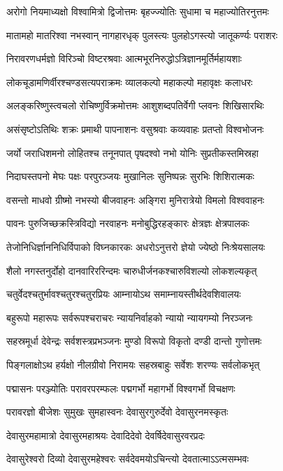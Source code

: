 \twolineshloka
{अरोगो नियमाध्यक्षो विश्वामित्रो द्विजोत्तमः}
{बृहज्ज्योतिः सुधामा च महाज्योतिरनुत्तमः}

\twolineshloka
{मातामहो मातरिश्वा नभस्वान् नागहारधृक्}
{पुलस्त्यः पुलहोऽगस्त्यो जातूकर्ण्यः पराशरः}

\twolineshloka
{निरावरणधर्मज्ञो विरिञ्चो विष्टरश्रवाः}
{आत्मभूरनिरुद्धोऽत्रिज्ञानमूर्तिर्महायशाः}

\twolineshloka
{लोकचूडामणिर्वीरश्चण्डसत्यपराक्रमः}
{व्यालकल्पो महाकल्पो महावृक्षः कलाधरः}

\twolineshloka
{अलङ्करिष्णुस्त्वचलो रोचिष्णुर्विक्रमोत्तमः}
{आशुशब्दपतिर्वेगी प्लवनः शिखिसारथिः}

\twolineshloka
{असंसृष्टोऽतिथिः शक्रः प्रमाथी पापनाशनः}
{वसुश्रवाः कव्यवाहः प्रतप्तो विश्वभोजनः}

\twolineshloka
{जर्यो जराधिशमनो लोहितश्च तनूनपात्}
{पृषदश्वो नभो योनिः सुप्रतीकस्तमिस्रहा}

\twolineshloka
{निदाघस्तपनो मेघः पक्षः परपुरञ्जयः}
{मुखानिलः सुनिष्पन्नः सुरभिः शिशिरात्मकः}

\twolineshloka
{वसन्तो माधवो ग्रीष्मो नभस्यो बीजवाहनः}
{अङ्गिरा मुनिरात्रेयो विमलो विश्ववाहनः}

\twolineshloka
{पावनः पुरुजिच्छक्रस्त्रिविद्यो नरवाहनः}
{मनोबुद्धिरहङ्कारः क्षेत्रज्ञः क्षेत्रपालकः}

\twolineshloka
{तेजोनिधिर्ज्ञाननिधिर्विपाको विघ्नकारकः}
{अधरोऽनुत्तरो ज्ञेयो ज्येष्ठो निःश्रेयसालयः}

\twolineshloka
{शैलो नगस्तनुर्दोहो दानवारिररिन्दमः}
{चारुधीर्जनकश्चारुविशल्यो लोकशल्यकृत्}

\twolineshloka
{चतुर्वेदश्चतुर्भावश्चतुरश्चतुरप्रियः}
{आम्नायोऽथ समाम्नायस्तीर्थदेवशिवालयः}

\twolineshloka
{बहुरूपो महारूपः सर्वरूपश्चराचरः}
{न्यायनिर्वाहको न्यायो न्यायगम्यो निरञ्जनः}

\twolineshloka
{सहस्रमूर्धा देवेन्द्रः सर्वशस्त्रप्रभञ्जनः}
{मुण्डो विरूपो विकृतो दण्डी दान्तो गुणोत्तमः}

\twolineshloka
{पिङ्गलाक्षोऽथ हर्यक्षो नीलग्रीवो निरामयः}
{सहस्रबाहुः सर्वेशः शरण्यः सर्वलोकभृत्}

\twolineshloka
{पद्मासनः परञ्ज्योतिः परावरपरम्फलः}
{पद्मगर्भो महागर्भो विश्वगर्भो विचक्षणः}

\twolineshloka
{परावरज्ञो बीजेशः सुमुखः सुमहास्वनः}
{देवासुरगुरुर्देवो देवासुरनमस्कृतः}

\twolineshloka
{देवासुरमहामात्रो देवासुरमहाश्रयः}
{देवादिदेवो देवर्षिदेवासुरवरप्रदः}

\twolineshloka
{देवासुरेश्वरो दिव्यो देवासुरमहेश्वरः}
{सर्वदेवमयोऽचिन्त्यो देवतात्माऽऽत्मसम्भवः}

